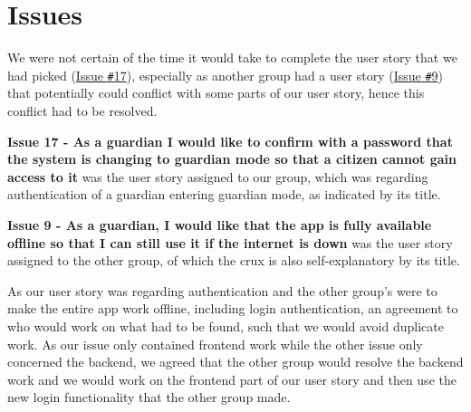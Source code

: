 \section{Issues}
We were not certain of the time it would take to complete the user story that we had picked (\href{https://github.com/aau-giraf/wiki/issues/17}{Issue \texttt{\#}17}), especially as another group had a user story (\href{https://github.com/aau-giraf/wiki/issues/9}{Issue \texttt{\#}9}) that potentially could conflict with some parts of our user story, hence this conflict had to be resolved.

\textbf{Issue 17 - As a guardian I would like to confirm with a password that the system is changing to guardian mode so that a citizen cannot gain access to it} was the user story assigned to our group, which was regarding authentication of a guardian entering guardian mode, as indicated by its title.

\textbf{Issue 9 - As a guardian, I would like that the app is fully available offline so that I can still use it if the internet is down} was the user story assigned to the other group, of which the crux is also self-explanatory by its title.

As our user story was regarding authentication and the other group's were to make the entire app work offline, including login authentication, an agreement to who would work on what had to be found, such that we would avoid duplicate work.
As our issue only contained frontend work while the other issue only concerned the backend, we agreed that the other group would resolve the backend work and we would work on the frontend part of our user story and then use the new login functionality that the other group made.
